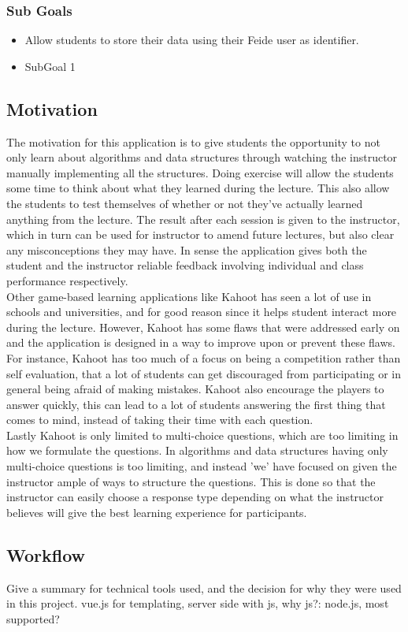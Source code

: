 \subsubsection{Sub Goals}
\begin{itemize}
\item Allow students to store their data using their Feide user as identifier.
\item SubGoal 1 
\end{itemize}

\subsection{Motivation}
The motivation for this application is to give students the opportunity to not only learn about algorithms and data structures through watching the instructor manually implementing all the structures. Doing exercise will allow the students some time to think about what they learned during the lecture. This also allow the students to test themselves of whether or not they've actually learned anything from the lecture. The result after each session is given to the instructor, which in turn can be used for instructor to amend future lectures, but also clear any misconceptions they may have. In sense the application gives both the student and the instructor reliable feedback involving individual and class performance respectively.\\
Other game-based learning applications like Kahoot has seen a lot of use in schools and universities, and for good reason since it helps student interact more during the lecture. However, Kahoot has some flaws that were addressed early on and the application is designed in a way to improve upon or prevent these flaws. For instance, Kahoot has too much of a focus on being a competition rather than self evaluation, that a lot of students can get discouraged from participating or in general being afraid of making mistakes. Kahoot also encourage the players to answer quickly, this can lead to a lot of students answering the first thing that comes to mind, instead of taking their time with each question.\\
Lastly Kahoot is only limited to multi-choice questions, which are too limiting in how we formulate the questions. In algorithms and data structures having only multi-choice questions is too limiting, and instead 'we' have focused on given the instructor ample of ways to structure the questions. This is done so that the instructor can easily choose a response type depending on what the instructor believes will give the best learning experience for participants.

\subsection{Workflow}
Give a summary for technical tools used, and the decision for why they were used in this project. vue.js for templating, server side with js, why js?: node.js, most supported?
